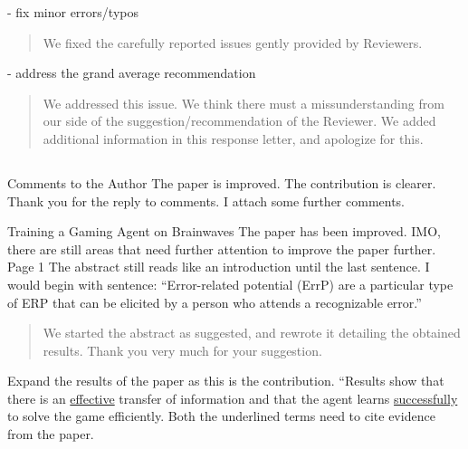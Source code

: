 \documentclass[journal,onecolumn,12pt]{IEEEtran}
\begin{document}
- fix minor errors/typos

\begin{quotation}
{\color{blue}
We fixed the carefully reported issues gently provided by Reviewers.
}
\end{quotation}

- address the grand average recommendation

\begin{quotation}
{\color{blue}
We addressed this issue.  We think there must a missunderstanding from our side of the suggestion/recommendation of the Reviewer.  We added additional information in this response letter, and apologize for this.
}
\end{quotation}

\subsection*{}

Comments to the Author
The paper is improved. The contribution is clearer. Thank you for the reply to comments. I attach some further comments.

Training a Gaming Agent on Brainwaves
The paper has been improved. IMO, there are still areas that need further attention to improve the paper further.
Page 1
The abstract still reads like an introduction until the last sentence.  I would begin with sentence: “Error-related potential (ErrP) are a particular type of ERP that can be elicited by a person who attends a recognizable error.”

\begin{quotation}
{\color{blue}
We started the abstract as suggested, and rewrote it detailing the obtained results.   Thank you very much for your suggestion.
}
\end{quotation}


Expand the results of the paper as this is the contribution.
“Results show that there is an  \underline{effective} transfer of information and that the agent learns \underline{successfully} to solve the game efficiently.
Both the underlined terms need to cite evidence from the paper.
\end{document}
